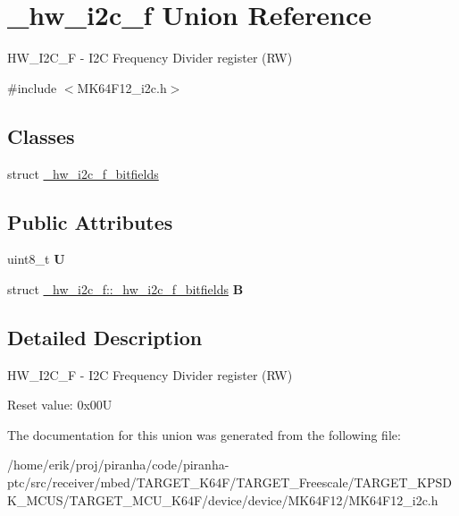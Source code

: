 \hypertarget{union__hw__i2c__f}{}\section{\+\_\+hw\+\_\+i2c\+\_\+f Union Reference}
\label{union__hw__i2c__f}


H\+W\+\_\+\+I2\+C\+\_\+F -\/ I2C Frequency Divider register (RW)  




{\ttfamily \#include $<$M\+K64\+F12\+\_\+i2c.\+h$>$}

\subsection*{Classes}
\begin{DoxyCompactItemize}
\item 
struct \hyperlink{struct__hw__i2c__f_1_1__hw__i2c__f__bitfields}{\+\_\+hw\+\_\+i2c\+\_\+f\+\_\+bitfields}
\end{DoxyCompactItemize}
\subsection*{Public Attributes}
\begin{DoxyCompactItemize}
\item 
uint8\+\_\+t {\bfseries U}\hypertarget{union__hw__i2c__f_a35b5219a5e1baf8225bb388e52a8a46c}{}\label{union__hw__i2c__f_a35b5219a5e1baf8225bb388e52a8a46c}

\item 
struct \hyperlink{struct__hw__i2c__f_1_1__hw__i2c__f__bitfields}{\+\_\+hw\+\_\+i2c\+\_\+f\+::\+\_\+hw\+\_\+i2c\+\_\+f\+\_\+bitfields} {\bfseries B}\hypertarget{union__hw__i2c__f_a1fcb9de12cde670075cc4938134d81e7}{}\label{union__hw__i2c__f_a1fcb9de12cde670075cc4938134d81e7}

\end{DoxyCompactItemize}


\subsection{Detailed Description}
H\+W\+\_\+\+I2\+C\+\_\+F -\/ I2C Frequency Divider register (RW) 

Reset value\+: 0x00U 

The documentation for this union was generated from the following file\+:\begin{DoxyCompactItemize}
\item 
/home/erik/proj/piranha/code/piranha-\/ptc/src/receiver/mbed/\+T\+A\+R\+G\+E\+T\+\_\+\+K64\+F/\+T\+A\+R\+G\+E\+T\+\_\+\+Freescale/\+T\+A\+R\+G\+E\+T\+\_\+\+K\+P\+S\+D\+K\+\_\+\+M\+C\+U\+S/\+T\+A\+R\+G\+E\+T\+\_\+\+M\+C\+U\+\_\+\+K64\+F/device/device/\+M\+K64\+F12/M\+K64\+F12\+\_\+i2c.\+h\end{DoxyCompactItemize}
